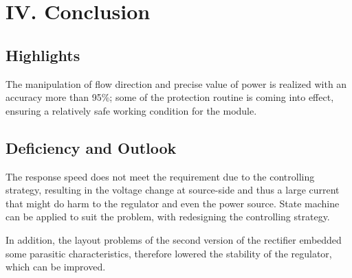 \documentclass[a4paper,num-refs]{oup-contemporary}
\begin{document}
\section{IV. Conclusion}

\subsection{Highlights}
The manipulation of flow direction and precise value of power is realized with an accuracy more than 95\%; some of the protection routine is coming into effect, ensuring a relatively safe working condition for the module.

\subsection{Deficiency and Outlook}
The response speed does not meet the requirement due to the controlling strategy, resulting in the voltage change at source-side and thus a large current that might do harm to the regulator and even the power source. State machine can be applied to suit the problem, with redesigning the controlling strategy.

In addition, the layout problems of the second version of the rectifier embedded some parasitic characteristics, therefore lowered the stability of the regulator, which can be improved.
\end{document}
